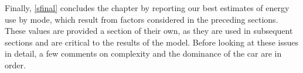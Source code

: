 Finally, \cref{sfinal} concludes the chapter by reporting our best
estimates of energy use by mode,
which result from factors considered in the preceding sections. These
values are provided a section of their own, as they are used in subsequent
sections and are critical to the results of the model. Before looking at these
issues in detail, a few comments on complexity and the dominance of the car are
in order.

